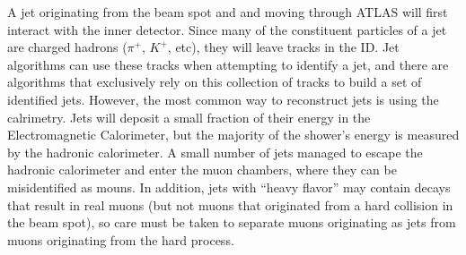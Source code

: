 A jet originating from the beam spot and and moving through ATLAS will first interact with the inner detector.  Since many of the constituent particles of a jet are charged hadrons ($\pi^{+}$, $K^{+}$, etc), they will leave tracks in the ID.
Jet algorithms can use these tracks when attempting to identify a jet, and there are algorithms that exclusively rely on this collection of tracks to build a set of identified jets.
However, the most common way to reconstruct jets is using the calrimetry.
Jets will deposit a small fraction of their energy in the Electromagnetic Calorimeter, but the majority of the shower's energy is measured by the hadronic calorimeter.
A small number of jets managed to escape the hadronic calorimeter and enter the muon chambers, where they can be misidentified as mouns.
In addition, jets with ``heavy flavor'' may contain decays that result in real muons (but not muons that originated from a hard collision in the beam spot), so care must be taken to separate muons originating as jets from muons originating from the hard process.

